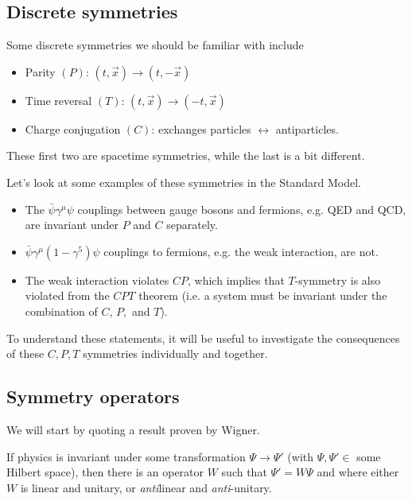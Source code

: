 \subsection*{Discrete symmetries}
Some discrete symmetries we should be familiar with include
\begin{itemize}
    \item Parity $(P)$: $(t,\vec x) \to (t,-\vec x)$
    \item Time reversal $(T)$: $(t,\vec x) \to (-t,\vec x)$
    \item Charge conjugation $(C)$: exchanges particles $\leftrightarrow$ antiparticles.
\end{itemize}
These first two are spacetime symmetries, while the last is a bit different.
\begin{exm}
    Let's look at some examples of these symmetries in the Standard Model.
    \begin{itemize}
        \item The $\bar \psi \gamma^\mu \psi$ couplings between gauge bosons and fermions, e.g. QED and QCD, are invariant under $P$ and $C$ separately.
        \item $\bar \psi \gamma^\mu(1-\gamma^5) \psi$ couplings to fermions, e.g. the weak interaction, are not.
        \item The weak interaction violates $CP$, which implies that $T$-symmetry is also violated from the $CPT$ theorem (i.e. a system must be invariant under the combination of $C$, $P,$ and $T$).
    \end{itemize}
\end{exm}
To understand these statements, it will be useful to investigate the consequences of these $C,P,T$ symmetries individually and together.
\subsection*{Symmetry operators}
We will start by quoting a result proven by Wigner. 
\begin{thm}
If physics is invariant under some transformation $\Psi\to \Psi'$ (with $\Psi,\Psi'\in$ some Hilbert space), then there is an operator $W$ such that $\Psi'=W\Psi$ and where either $W$ is linear and unitary, or \emph{anti}linear and \emph{anti}-unitary.
\end{thm}